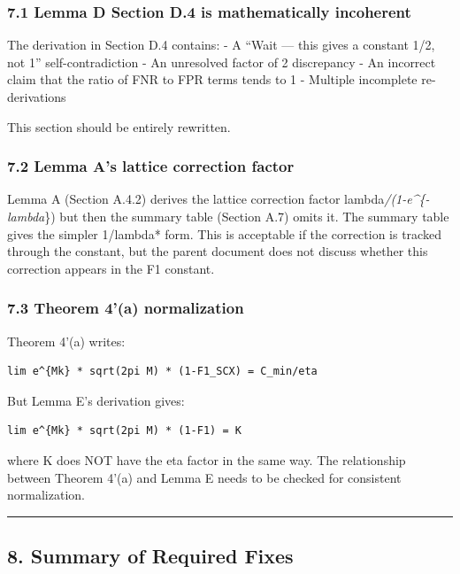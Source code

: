 \documentclass[
  12pt,
]{ctexart}
\begin{document}
\subsubsection{7.1 Lemma D Section D.4 is mathematically
incoherent}\label{lemma-d-section-d.4-is-mathematically-incoherent}

The derivation in Section D.4 contains: - A ``Wait --- this gives a
constant 1/2, not 1'' self-contradiction - An unresolved factor of 2
discrepancy - An incorrect claim that the ratio of FNR to FPR terms
tends to 1 - Multiple incomplete re-derivations

This section should be entirely rewritten.

\subsubsection{7.2 Lemma A's lattice correction
factor}\label{lemma-as-lattice-correction-factor}

Lemma A (Section A.4.2) derives the lattice correction factor
lambda\emph{/(1-e\^{}\{-lambda}\}) but then the summary table (Section
A.7) omits it. The summary table gives the simpler 1/lambda* form. This
is acceptable if the correction is tracked through the constant, but the
parent document does not discuss whether this correction appears in the
F1 constant.

\subsubsection{7.3 Theorem 4'(a)
normalization}\label{theorem-4a-normalization}

Theorem 4'(a) writes:

\begin{verbatim}
lim e^{Mk} * sqrt(2pi M) * (1-F1_SCX) = C_min/eta
\end{verbatim}

But Lemma E's derivation gives:

\begin{verbatim}
lim e^{Mk} * sqrt(2pi M) * (1-F1) = K
\end{verbatim}

where K does NOT have the eta factor in the same way. The relationship
between Theorem 4'(a) and Lemma E needs to be checked for consistent
normalization.

\begin{center}\rule{0.5\linewidth}{0.5pt}\end{center}

\subsection{8. Summary of Required
Fixes}\label{summary-of-required-fixes}
\end{document}

